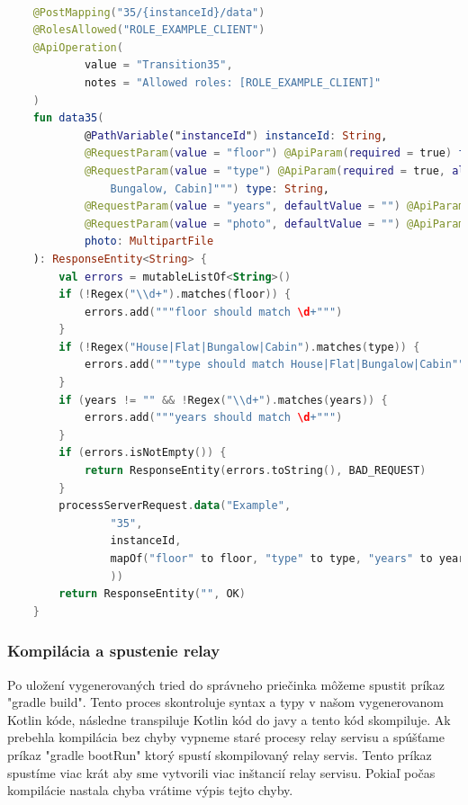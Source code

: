 \begin{lstlisting}[float, caption={Príklad vygenerovanej funkcie},label={alg:generated_endpoint},language=Kotlin]

    @PostMapping("35/{instanceId}/data")
    @RolesAllowed("ROLE_EXAMPLE_CLIENT")
    @ApiOperation(
            value = "Transition35",
            notes = "Allowed roles: [ROLE_EXAMPLE_CLIENT]"
    )
    fun data35(
            @PathVariable("instanceId") instanceId: String,
            @RequestParam(value = "floor") @ApiParam(required = true) floor: String,
            @RequestParam(value = "type") @ApiParam(required = true, allowableValues = """[House, Flat,
                Bungalow, Cabin]""") type: String,
            @RequestParam(value = "years", defaultValue = "") @ApiParam(required = false) years: String,
            @RequestParam(value = "photo", defaultValue = "") @ApiParam(required = false)
            photo: MultipartFile
    ): ResponseEntity<String> {
        val errors = mutableListOf<String>()
        if (!Regex("\\d+").matches(floor)) {
            errors.add("""floor should match \d+""")
        }
        if (!Regex("House|Flat|Bungalow|Cabin").matches(type)) {
            errors.add("""type should match House|Flat|Bungalow|Cabin""")
        }
        if (years != "" && !Regex("\\d+").matches(years)) {
            errors.add("""years should match \d+""")
        }
        if (errors.isNotEmpty()) {
            return ResponseEntity(errors.toString(), BAD_REQUEST)
        }
        processServerRequest.data("Example",
                "35",
                instanceId,
                mapOf("floor" to floor, "type" to type, "years" to years, "photo" to photo
                ))
        return ResponseEntity("", OK)
    }
\end{lstlisting}

\subsubsection{Kompilácia a spustenie relay}
Po uložení vygenerovaných tried do správneho priečinka môžeme spustit príkaz "gradle build". Tento proces skontroluje syntax a typy v našom vygenerovanom Kotlin kóde, následne transpiluje Kotlin kód do javy a tento kód skompiluje. Ak prebehla kompilácia bez chyby vypneme staré procesy relay servisu a spúšťame príkaz "gradle bootRun" ktorý spustí skompilovaný relay servis. Tento príkaz spustíme viac krát aby sme vytvorili viac inštancií relay servisu. Pokiaľ počas kompilácie nastala chyba vrátime výpis tejto chyby. 


